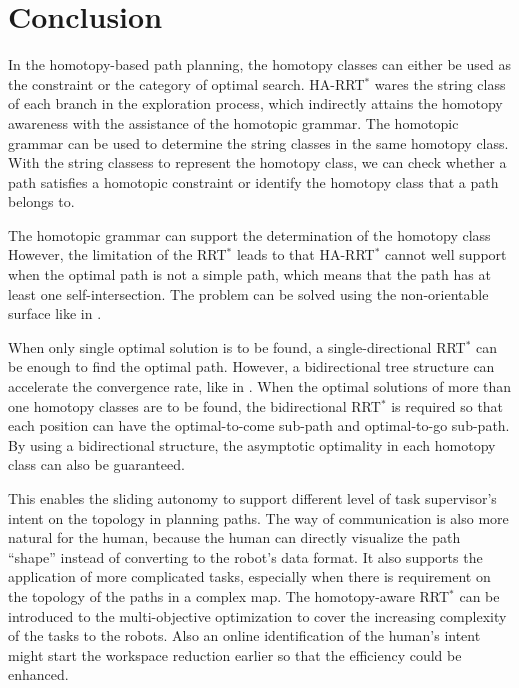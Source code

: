 \documentclass[letterpaper, 10 pt, conference]{ieeeconf}
\begin{document}
\section{Conclusion}
\label{sec:conclusion}

In the homotopy-based path planning, the homotopy classes can either be used as the constraint or the category of optimal search.
HA-RRT$^{*}$ wares the string class of each branch in the exploration process, which indirectly attains the homotopy awareness with the assistance of the homotopic grammar.
The homotopic grammar can be used to determine the string classes in the same homotopy class.
With the string classess to represent the homotopy class, we can check whether a path satisfies a homotopic constraint 
or identify the homotopy class that a path belongs to.

The homotopic grammar can support the determination of the homotopy class 
However, the limitation of the RRT$^{*}$ leads to that HA-RRT$^{*}$ cannot well support when the optimal path is not a simple path, which means that the path has at least one self-intersection.
The problem can be solved using the non-orientable surface like in \cite{Hershberger199463}.

When only single optimal solution is to be found, a single-directional RRT$^{*}$ can be enough to find the optimal path.
However, a bidirectional tree structure can accelerate the convergence rate, like in \cite{starek2014bidirectional}.
When the optimal solutions of more than one homotopy classes are to be found, the bidirectional RRT$^{*}$ is required so that each position can have the optimal-to-come sub-path and optimal-to-go sub-path.
By using a bidirectional structure, the asymptotic optimality in each homotopy class can also be guaranteed.

This enables the sliding autonomy to support different level of task supervisor's intent on the topology in planning paths.
The way of communication is also more natural for the human, because the human can directly visualize the path ``shape'' instead of converting to the robot's data format.
It also supports the application of more complicated tasks, especially when there is requirement on the topology of the paths in a complex map.
The homotopy-aware RRT$^{*}$ can be introduced to the multi-objective optimization to cover the increasing complexity of the tasks to the robots.
Also an online identification of the human's intent might start the workspace reduction earlier so that the efficiency could be enhanced.



\end{document}
